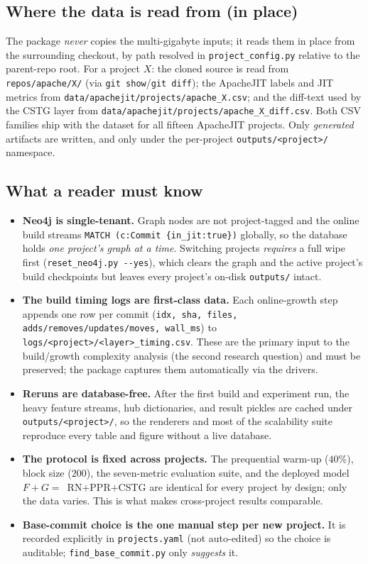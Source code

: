 \documentclass[11pt,a4paper]{article}
\newcommand{\code}[1]{\texttt{#1}}
\begin{document}
	\subsection{Where the data is read from (in place)}\label{sec:repro-data}
	The package \emph{never} copies the multi-gigabyte inputs; it reads them in place
	from the surrounding checkout, by path resolved in \code{project\_config.py}
	relative to the parent-repo root. For a project $X$: the cloned source is read from
	\code{repos/apache/X/} (via \code{git show}/\code{git diff}); the ApacheJIT labels
	and JIT metrics from \code{data/apachejit/projects/apache\_X.csv}; and the
	diff-text used by the CSTG layer from
	\code{data/apachejit/projects/apache\_X\_diff.csv}. Both CSV families ship with the
	dataset for all fifteen ApacheJIT projects. Only \emph{generated} artifacts are
	written, and only under the per-project \code{outputs/<project>/} namespace.

	\subsection{What a reader must know}\label{sec:repro-notes}
	\begin{itemize}[nosep,leftmargin=1.4em]
		\item \textbf{Neo4j is single-tenant.} Graph nodes are not project-tagged and
		the online build streams \code{MATCH (c:Commit \{in\_jit:true\})} globally, so
		the database holds \emph{one project's graph at a time}. Switching projects
		\emph{requires} a full wipe first (\code{reset\_neo4j.py -{-}yes}), which clears
		the graph and the active project's build checkpoints but leaves every project's
		on-disk \code{outputs/} intact.
		\item \textbf{The build timing logs are first-class data.} Each online-growth
		step appends one row per commit
		(\code{idx, sha, files, adds/removes/updates/moves, wall\_ms}) to
		\code{logs/<project>/<layer>\_timing.csv}. These are the primary input to the
		build/growth complexity analysis (the second research question) and must be
		preserved; the package captures them automatically via the drivers.
		\item \textbf{Reruns are database-free.} After the first build and experiment
		run, the heavy feature streams, hub dictionaries, and result pickles are cached
		under \code{outputs/<project>/}, so the renderers and most of the scalability
		suite reproduce every table and figure without a live database.
		\item \textbf{The protocol is fixed across projects.} The prequential warm-up
		($40\%$), block size ($200$), the seven-metric evaluation suite, and the
		deployed model \mbox{$F{+}G=$~RN$+$PPR$+$CSTG} are identical for every project
		by design; only the data varies. This is what makes cross-project results
		comparable.
		\item \textbf{Base-commit choice is the one manual step per new project.} It is
		recorded explicitly in \code{projects.yaml} (not auto-edited) so the choice is
		auditable; \code{find\_base\_commit.py} only \emph{suggests} it.
	\end{itemize}
\end{document}
